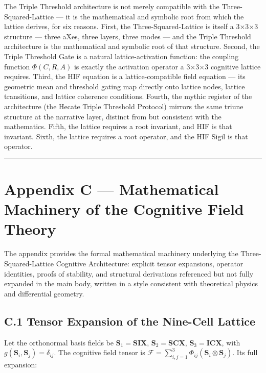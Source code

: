 The Triple Threshold architecture is not merely compatible with the Three-Squared-Lattice --- it is the mathematical and symbolic root from which the lattice derives, for six reasons. First, the Three-Squared-Lattice is itself a 3×3×3 structure --- three aXes, three layers, three modes --- and the Triple Threshold architecture is the mathematical and symbolic root of that structure. Second, the Triple Threshold Gate is a natural lattice-activation function: the coupling function \(\Phi(C,R,A)\) is exactly the activation operator a 3×3×3 cognitive lattice requires. Third, the HIF equation is a lattice-compatible field equation --- its geometric mean and threshold gating map directly onto lattice nodes, lattice transitions, and lattice coherence conditions. Fourth, the mythic register of the architecture (the Hecate Triple Threshold Protocol) mirrors the same triune structure at the narrative layer, distinct from but consistent with the mathematics. Fifth, the lattice requires a root invariant, and HIF is that invariant. Sixth, the lattice requires a root operator, and the HIF Sigil is that operator.

\begin{center}\rule{0.5\linewidth}{0.5pt}\end{center}

\section{Appendix C --- Mathematical Machinery of the Cognitive Field Theory}\label{appendix-c-mathematical-machinery-of-the-cognitive-field-theory}

The appendix provides the formal mathematical machinery underlying the Three-Squared-Lattice Cognitive Architecture: explicit tensor expansions, operator identities, proofs of stability, and structural derivations referenced but not fully expanded in the main body, written in a style consistent with theoretical physics and differential geometry.

\subsection{C.1 Tensor Expansion of the Nine-Cell Lattice}\label{c.1-tensor-expansion-of-the-nine-cell-lattice}

Let the orthonormal basis fields be \(\mathbf{S}_1 = \mathbf{SIX}\), \(\mathbf{S}_2 = \mathbf{SCX}\), \(\mathbf{S}_3 = \mathbf{ICX}\), with \(g(\mathbf{S}_i,\mathbf{S}_j)=\delta_{ij}\). The cognitive field tensor is \(\mathcal{F}=\sum_{i,j=1}^{3}\Phi_{ij}(\mathbf{S}_i\otimes\mathbf{S}_j)\). Its full expansion:

